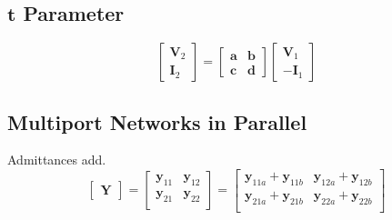 	\subsection*{$\mathbf{t}$ Parameter} \label{subsec:t Parameter}
		\begin{equation*} \label{eq:t Parameter}
			\begin{bmatrix}
				\mathbf{V}_{2} \\
				\mathbf{I}_{2} 
			\end{bmatrix}
			=\begin{bmatrix}
				\mathbf{a} & \mathbf{b} \\
				\mathbf{c} & \mathbf{d}
			\end{bmatrix}
			\begin{bmatrix}
				\mathbf{V}_{1} \\
				\mathbf{-I}_{1} 
			\end{bmatrix}
		\end{equation*}
	
	\subsection*{Multiport Networks in Parallel} \label{subsec:Parallel Multiport Networks}
	Admittances add.
		\begin{equation*} \label{eq:Parallel Multiport Networks}
			\begin{bmatrix}
				\mathbf{Y}
			\end{bmatrix}
			= \begin{bmatrix}
				\mathbf{y}_{11} & \mathbf{y}_{12} \\
				\mathbf{y}_{21} & \mathbf{y}_{22} \\
			\end{bmatrix}
			= \begin{bmatrix}
				\mathbf{y}_{11a}+\mathbf{y}_{11b} & \mathbf{y}_{12a}+\mathbf{y}_{12b} \\
				\mathbf{y}_{21a}+\mathbf{y}_{21b} & \mathbf{y}_{22a}+\mathbf{y}_{22b} \\
			\end{bmatrix}
		\end{equation*}
		
